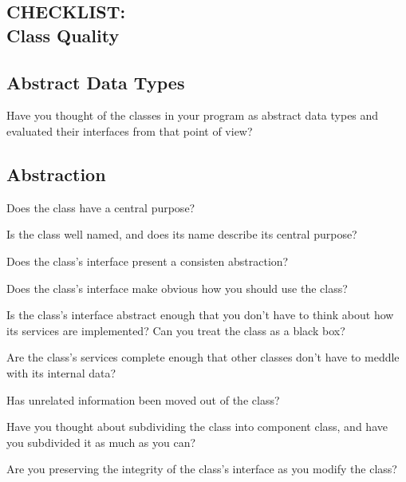 \newpage
{}


\begin{multicols}{2}
\section*{CHECKLIST:\\Class Quality}

\subsection*{Abstract Data Types}
%
\begin{todolist}
  \item Have you thought of the classes in your program as abstract data types
and evaluated their interfaces from that point of view?
\end{todolist}

\subsection*{Abstraction}
\begin{todolist}
  \item Does the class have a central purpose?
  \item Is the class well named, and does its name describe its central purpose?
  \item Does the class's interface present a consisten abstraction?
  \item Does the class's interface make obvious how you should use the class?
  \item Is the class's interface abstract enough that you don't have to think about how its services are implemented? Can you treat the class as a black box?
  \item Are the class's services complete enough that other classes don't have to meddle with its internal data?
  \item Has unrelated information been moved out of the class?
  \item Have you thought about subdividing the class into component class, and have you subdivided it as much as you can?
  \item Are you preserving the integrity of the class's interface as you modify the class?
\end{todolist}


\end{multicols}

